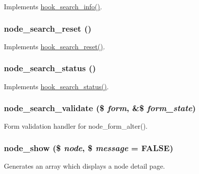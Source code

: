 \label{node_8module_a37b324db553dbb556ae8932d72bf1fba}
Implements \hyperlink{group__search_ga37b761616f2cad4796891008f2b374f3}{hook\_\-search\_\-info()}. \hypertarget{node_8module_a6e9bd2c7f38cc740261f21679c656d32}{
\subsubsection[{node\_\-search\_\-reset}]{\setlength{\rightskip}{0pt plus 5cm}node\_\-search\_\-reset ()}}
\label{node_8module_a6e9bd2c7f38cc740261f21679c656d32}
Implements \hyperlink{group__search_gaefc7ab0e4a53a2752371dcccaec41deb}{hook\_\-search\_\-reset()}. \hypertarget{node_8module_a94fbf3616adf60ed473c6dd5615568ac}{
\subsubsection[{node\_\-search\_\-status}]{\setlength{\rightskip}{0pt plus 5cm}node\_\-search\_\-status ()}}
\label{node_8module_a94fbf3616adf60ed473c6dd5615568ac}
Implements \hyperlink{group__search_gafb7f508058afed4fe670974b82b072f2}{hook\_\-search\_\-status()}. \hypertarget{node_8module_ae3de6c6c7c68a30d51e300264b905930}{
\subsubsection[{node\_\-search\_\-validate}]{\setlength{\rightskip}{0pt plus 5cm}node\_\-search\_\-validate (\$ {\em form}, \/  \&\$ {\em form\_\-state})}}
\label{node_8module_ae3de6c6c7c68a30d51e300264b905930}
Form validation handler for node\_\-form\_\-alter(). \hypertarget{node_8module_a009f1685fb132153f1590c318ffb949a}{
\subsubsection[{node\_\-show}]{\setlength{\rightskip}{0pt plus 5cm}node\_\-show (\$ {\em node}, \/  \$ {\em message} = {\ttfamily FALSE})}}
\label{node_8module_a009f1685fb132153f1590c318ffb949a}
Generates an array which displays a node detail page.


